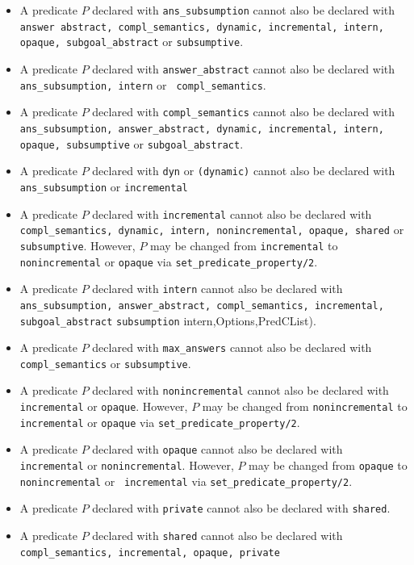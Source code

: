 \begin{itemize}
\item A predicate $P$ declared with {\tt ans\_subsumption} cannot also
  be declared with {\tt answer abstract, compl\_semantics, dynamic, incremental, intern,
    opaque, subgoal\_abstract} or {\tt subsumptive}.
%
\item A predicate $P$ declared with {\tt answer\_abstract} cannot also
  be declared with {\tt ans\_subsumption, intern} or {\tt
    compl\_semantics}.
%
\item A predicate $P$ declared with {\tt compl\_semantics} cannot also
  be declared with {\tt ans\_subsumption, answer\_abstract, dynamic,
    incremental, intern, opaque, subsumptive} or {\tt subgoal\_abstract}.
%
\item A predicate $P$ declared with {\tt dyn} or {\tt (dynamic)} cannot also
  be declared with {\tt ans\_subsumption} or {\tt incremental}
%
\item A predicate $P$ declared with {\tt incremental} cannot also be
  declared with {\tt compl\_semantics, dynamic, intern,
    nonincremental, opaque, shared} or {\tt subsumptive}.  However,
  $P$ may be changed from {\tt incremental} to {\tt nonincremental} or
  {\tt opaque} via {\tt set\_predicate\_property/2}.
%
\item A predicate $P$ declared with {\tt intern} cannot also be
  declared with {\tt ans\_subsumption, answer\_abstract,
    compl\_semantics, incremental, subgoal\_abstract} {\tt subsumption}
  intern,Options,PredCList).
%
\item A predicate $P$ declared with {\tt max\_answers} cannot also be
  declared with {\tt compl\_semantics} or {\tt subsumptive}.
%
\item A predicate $P$ declared with {\tt nonincremental} cannot also
  be declared with {\tt incremental} or {\tt opaque}.  However, $P$
  may be changed from {\tt nonincremental} to {\tt incremental} or
  {\tt opaque} via {\tt set\_predicate\_property/2}.
%
\item A predicate $P$ declared with {\tt opaque} cannot also be
  declared with {\tt incremental} or {\tt nonincremental}.  However,
  $P$ may be changed from {\tt opaque} to {\tt nonincremental} or {\tt
    incremental} via {\tt set\_predicate\_property/2}.
%
\item A predicate $P$ declared with {\tt private} cannot also
  be declared with {\tt shared}.
%
\item A predicate $P$ declared with {\tt shared} cannot also be
  declared with {\tt compl\_semantics, incremental, opaque, private}

\end{itemize}
